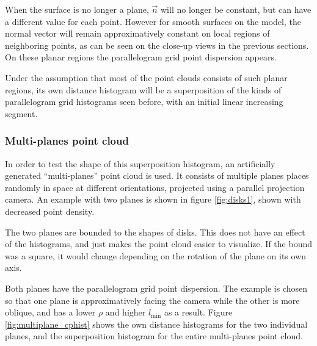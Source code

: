 When the surface is no longer a plane, $\vec{n}$ will no longer be constant, but can have a different value for each point. However for smooth surfaces on the model, the normal vector will remain approximatively constant on local regions of neighboring points, as can be seen on the close-up views in the previous sections. On these planar regions the parallelogram grid point dispersion appears.

Under the assumption that most of the point clouds consists of such planar regions, its own distance histogram will be a superposition of the kinds of parallelogram grid histograms seen before, with an initial linear increasing segment.

\subsubsection{Multi-planes point cloud}
In order to test the shape of this superposition histogram, an artificially generated ``multi-planes'' point cloud is used. It consists of multiple planes places randomly in space at different orientations, projected using a parallel projection camera. An example with two planes is shown in figure \ref{fig:disks1}, shown with decreased point density.

The two planes are bounded to the shapes of disks. This does not have an effect of the histograms, and just makes the point cloud easier to visualize. If the bound was a square, it would change depending on the rotation of the plane on its own axis.

Both planes have the parallelogram grid point dispersion. The example is chosen so that one plane is approximatively facing the camera while the other is more oblique, and has a lower $\rho$ and higher $l_\text{min}$ as a result. Figure \ref{fig:multiplane_cphist} shows the own distance histograms for the two individual planes, and the superposition histogram for the entire multi-planes point cloud.

